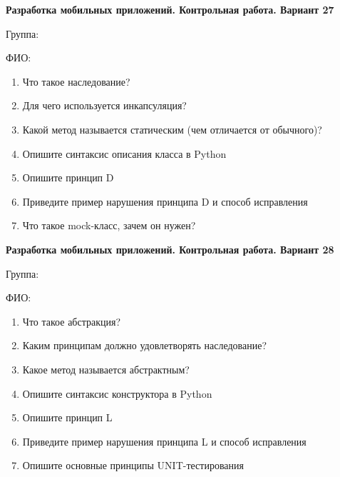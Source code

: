 \documentclass[12pt]{article}
\begin{document}
\vspace{40pt}\begin{minipage}{\textwidth}
\textbf{Разработка мобильных приложений. Контрольная работа. Вариант 27}

Группа: \underline{\hspace{3cm}}

ФИО: \underline{\hspace{10cm}}

\begin{enumerate}
\item Что такое наследование?
\item Для чего используется инкапсуляция?
\item Какой метод называется статическим (чем отличается от обычного)?
\item Опишите синтаксис описания класса в Python
\item Опишите принцип D
\item Приведите пример нарушения принципа D и способ исправления
\item Что такое mock-класс, зачем он нужен?

\end{enumerate}
\end{minipage}

\vspace{40pt}\begin{minipage}{\textwidth}
\textbf{Разработка мобильных приложений. Контрольная работа. Вариант 28}

Группа: \underline{\hspace{3cm}}

ФИО: \underline{\hspace{10cm}}

\begin{enumerate}
\item Что такое абстракция?
\item Каким принципам должно удовлетворять наследование?
\item Какое метод называется абстрактным?
\item Опишите синтаксис конструктора в Python
\item Опишите принцип L
\item Приведите пример нарушения принципа L и способ исправления
\item Опишите основные принципы UNIT-тестирования

\end{enumerate}
\end{minipage}
\end{document}
